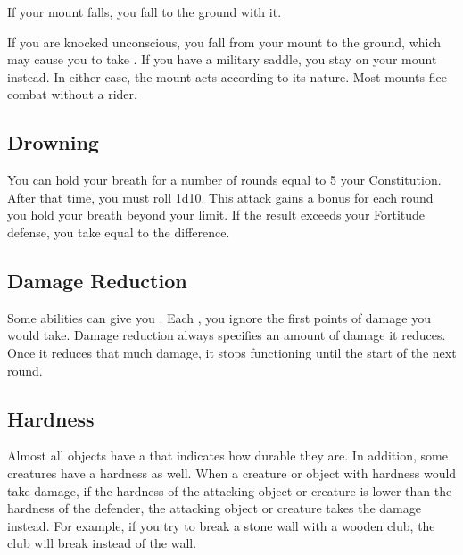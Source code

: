          If your mount falls, you fall to the ground with it.

         If you are knocked unconscious, you fall from your mount to the ground, which may cause you to take .
        If you have a military saddle, you stay on your mount instead.
        In either case, the mount acts according to its nature.
        Most mounts flee combat without a rider.

    \subsection{Drowning}\label{Drowning}
        You can hold your breath for a number of rounds equal to 5 \add your Constitution.
        After that time, you must roll 1d10.
        This attack gains a  bonus for each round you hold your breath beyond your limit.
        If the result exceeds your Fortitude defense, you take  equal to the difference.

    \subsection{Damage Reduction}\label{Damage Reduction}
        Some abilities can give you .
        Each , you ignore the first points of damage you would take.
        Damage reduction always specifies an amount of damage it reduces.
        Once it reduces that much damage, it stops functioning until the start of the next round.

    \subsection{Hardness}\label{Hardness}
        Almost all objects have a  that indicates how durable they are.
        In addition, some creatures have a hardness as well.
        When a creature or object with hardness would take damage, if the hardness of the attacking object or creature is lower than the hardness of the defender, the attacking object or creature takes the damage instead.
        For example, if you try to break a stone wall with a wooden club, the club will break instead of the wall.


